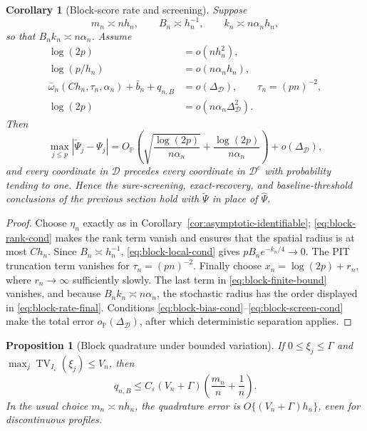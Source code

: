 \documentclass[11pt]{article}
\newtheorem{proposition}[theorem]{Proposition}
\newtheorem{corollary}[theorem]{Corollary}
\theoremstyle{definition}\newtheorem{definition}[theorem]{Definition}
\newcommand{\Pp}{\mathbb P}
\newcommand{\I}{I_\varepsilon}
\newcommand{\D}{\mathcal D}
\newcommand{\TV}{\operatorname{TV}}
\begin{document}
\begin{corollary}[Block-score rate and screening]
\label{cor:block-rate}
Suppose
\[
 m_n\asymp nh_n,
 \qquad B_n\asymp h_n^{-1},
 \qquad k_n\asymp n\alpha_nh_n,
\]
so that $B_nk_n\asymp n\alpha_n$.  Assume
\begin{align}
 \log(2p)&=o(nh_n^2),
 \label{eq:block-rank-cond}\\
 \log(p/h_n)&=o(n\alpha_nh_n),
 \label{eq:block-local-cond}\\
 \bar\omega_n(C h_n,\tau_n,\alpha_n)+\bar b_n+q_{n,B}
 &=o(\Delta_{\D}),
 \qquad \tau_n=(pn)^{-2},
 \label{eq:block-bias-cond}\\
 \log(2p)&=o(n\alpha_n\Delta_{\D}^2).
 \label{eq:block-screen-cond}
\end{align}
Then
\begin{equation}
 \max_{j\le p}|\widetilde\Psi_j-\Psi_j|
 =O_{\Pp}\!\left(
 \sqrt{\frac{\log(2p)}{n\alpha_n}}
 +\frac{\log(2p)}{n\alpha_n}
 \right)+o(\Delta_{\D}),
 \label{eq:block-rate-final}
\end{equation}
and every coordinate in $\D$ precedes every coordinate in $\D^c$ with
probability tending to one.  Hence the sure-screening, exact-recovery, and
baseline-threshold conclusions of the previous section hold with
$\widetilde\Psi$ in place of $\widehat\Psi$.
\end{corollary}

\begin{proof}
Choose $\eta_n$ exactly as in
Corollary~\ref{cor:asymptotic-identifiable};
\eqref{eq:block-rank-cond} makes the rank term vanish and ensures that the
spatial radius is at most $Ch_n$.  Since $B_n\asymp h_n^{-1}$,
\eqref{eq:block-local-cond} gives $pB_ne^{-k_n/4}\to0$.  The PIT truncation
term vanishes for $\tau_n=(pn)^{-2}$.  Finally choose
$x_n=\log(2p)+r_n$, where $r_n\to\infty$ sufficiently slowly.  The last term
in \eqref{eq:block-finite-bound} vanishes, and because
$B_nk_n\asymp n\alpha_n$, the stochastic radius has the order displayed in
\eqref{eq:block-rate-final}.  Conditions
\eqref{eq:block-bias-cond}--\eqref{eq:block-screen-cond} make the total error
$o_{\Pp}(\Delta_{\D})$, after which deterministic separation applies.
\end{proof}

\begin{proposition}[Block quadrature under bounded variation]
\label{prop:block-BV}
If $0\le\xi_j\le\Gamma$ and
$\max_j\TV_{\I}(\xi_j)\le V_n$, then
\begin{equation}
 q_{n,B}\le C_\varepsilon(V_n+\Gamma)
 \left(\frac{m_n}{n}+\frac1n\right).
 \label{eq:block-BV-bound}
\end{equation}
In the usual choice $m_n\asymp nh_n$, the quadrature error is
$O\{(V_n+\Gamma)h_n\}$, even for discontinuous profiles.
\end{proposition}
\end{document}
